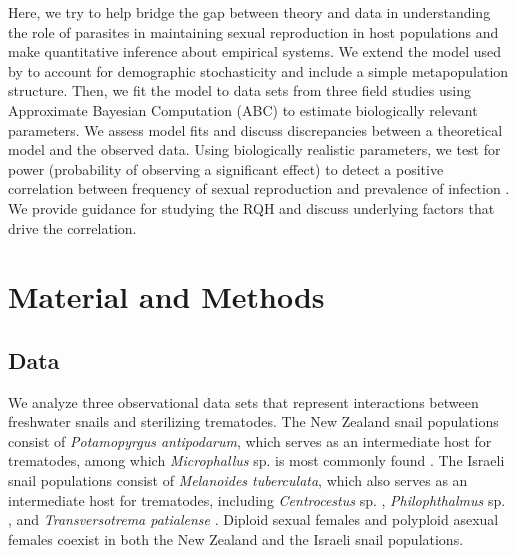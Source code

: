 \documentclass{article}\usepackage[]{graphicx}\usepackage[]{color}
\begin{document}
Here, we try to help bridge the gap between theory and data in understanding the role of parasites in maintaining sexual reproduction in host populations and make quantitative inference about empirical systems.
We extend the model used by \cite{lively2010epidemiological} to account for demographic stochasticity and include a simple metapopulation structure.
Then, we fit the model to data sets from three field studies \citep{dagan2013clonal, mckone2016fine, vergara2014infection} using Approximate Bayesian Computation (ABC) to estimate biologically relevant parameters.
We assess model fits and discuss discrepancies between a theoretical model and the observed data.
Using biologically realistic parameters, we test for power (probability of observing a significant effect) to detect a positive correlation between frequency of sexual reproduction and prevalence of infection \cite{lively2001trematode}.
We provide guidance for studying the RQH and discuss underlying factors that drive the correlation.

\section{Material and Methods}

\subsection{Data}

We analyze three observational data sets \citep{vergara2014infection, mckone2016fine, dagan2013clonal} that represent interactions between freshwater snails and sterilizing trematodes.
The New Zealand snail populations \citep{vergara2014infection, mckone2016fine} consist of \textit{Potamopyrgus antipodarum}, which serves as an intermediate host for trematodes, 
among which \textit{Microphallus} sp. is most commonly found \citep{winterbourn1974larval, lively1987evidence}.
The Israeli snail populations \citep{dagan2013clonal} consist of \textit{Melanoides tuberculata}, which also serves as an intermediate host for trematodes, including \textit{Centrocestus} sp. \citep{ben2005spatial}, \textit{Philophthalmus} sp. \citep{ben2006first}, and \textit{Transversotrema patialense} \citep{ben2005differential}.
Diploid sexual females and polyploid asexual females coexist in both the New Zealand \citep{phillips1989genetics, wallace1992parthenogenesis, dybdahl1995diverse} and the Israeli \citep{samadi1999microsatellite} snail populations.
\end{document}
